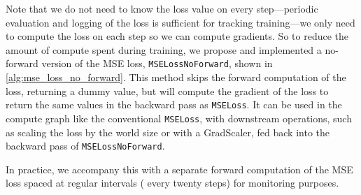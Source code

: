 Note that we do not need to know the loss value on every step---periodic evaluation and logging of the loss is sufficient for tracking training---we only need to compute the loss on each step so we can compute gradients.
So to reduce the amount of compute spent during training, we propose and implemented a no-forward version of the MSE loss, \texttt{MSELossNoForward}, shown in \cref{alg:mse_loss_no_forward}.
This method skips the forward computation of the loss, returning a dummy value, but will compute the gradient of the loss to return the same values in the backward pass as \texttt{MSELoss}.
It can be used in the compute graph like the conventional \texttt{MSELoss}, with downstream operations, such as scaling the loss by the world size or with a GradScaler, fed back into the backward pass of \texttt{MSELossNoForward}.

In practice, we accompany this with a separate forward computation of the MSE loss spaced at regular intervals (\eg{} every twenty steps) for monitoring purposes.

